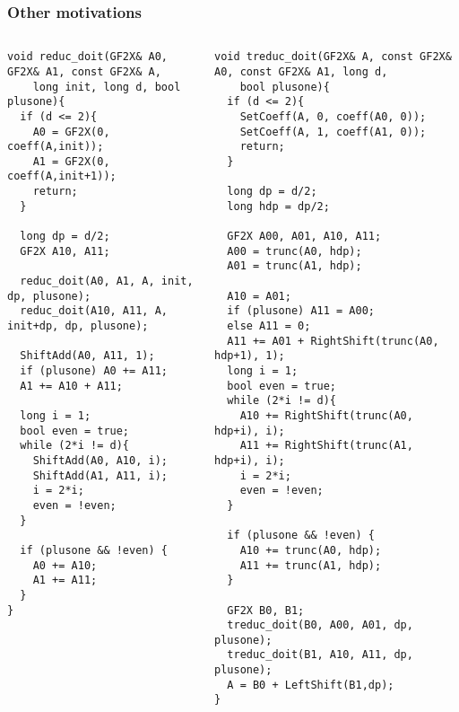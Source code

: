 \documentclass[10pt]{beamer}
\begin{document}
\begin{frame}[fragile]
  \tiny
  \frametitle{Other motivations}

  \begin{columns}
    \begin{column}{0.5\textwidth}
      \begin{center}
        \begin{minipage}{\textwidth}
\begin{verbatim}
void reduc_doit(GF2X& A0, GF2X& A1, const GF2X& A,
	long init, long d, bool plusone){
  if (d <= 2){
    A0 = GF2X(0, coeff(A,init));
    A1 = GF2X(0, coeff(A,init+1));
    return;
  }
   
  long dp = d/2;
  GF2X A10, A11;

  reduc_doit(A0, A1, A, init, dp, plusone);
  reduc_doit(A10, A11, A, init+dp, dp, plusone);
 
  ShiftAdd(A0, A11, 1);
  if (plusone) A0 += A11;
  A1 += A10 + A11;

  long i = 1;
  bool even = true;
  while (2*i != d){
    ShiftAdd(A0, A10, i);
    ShiftAdd(A1, A11, i);
    i = 2*i;
    even = !even;
  }
  
  if (plusone && !even) {
    A0 += A10;
    A1 += A11;
  }
}
\end{verbatim}
        \end{minipage}
      \end{center}
    \end{column}

    \begin{column}{0.5\textwidth}
      \begin{center}
        \begin{minipage}{\textwidth}
\begin{verbatim}
void treduc_doit(GF2X& A, const GF2X& A0, const GF2X& A1, long d,
	bool plusone){
  if (d <= 2){
    SetCoeff(A, 0, coeff(A0, 0));
    SetCoeff(A, 1, coeff(A1, 0));
    return;
  }
   
  long dp = d/2;
  long hdp = dp/2;

  GF2X A00, A01, A10, A11;
  A00 = trunc(A0, hdp);
  A01 = trunc(A1, hdp);

  A10 = A01;
  if (plusone) A11 = A00;
  else A11 = 0;
  A11 += A01 + RightShift(trunc(A0, hdp+1), 1);
  long i = 1;
  bool even = true;
  while (2*i != d){
    A10 += RightShift(trunc(A0, hdp+i), i);
    A11 += RightShift(trunc(A1, hdp+i), i);
    i = 2*i;
    even = !even;
  }
  
  if (plusone && !even) {
    A10 += trunc(A0, hdp);
    A11 += trunc(A1, hdp);
  }
  
  GF2X B0, B1;
  treduc_doit(B0, A00, A01, dp, plusone);
  treduc_doit(B1, A10, A11, dp, plusone);
  A = B0 + LeftShift(B1,dp);
}
\end{verbatim}
        \end{minipage}
      \end{center}
    \end{column}
    \end{columns}
\end{frame}
\end{document}
